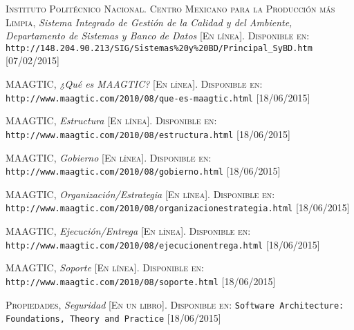 \begin{thebibliography}{X}
		\textsc{Instituto Politécnico Nacional. Centro Mexicano para la Producción más Limpia},
		\textit{Sistema Integrado de Gestión de la Calidad y del Ambiente, Departamento de Sistemas y Banco de Datos}
		\textsc{[En línea]. Disponible en:}
		\texttt{http://148.204.90.213/SIG/Sistemas\%20y\%20BD/Principal\_SyBD.htm}
		\textsc{[07/02/2015]}
		
		\textsc{MAAGTIC},
		\textit{¿Qué es MAAGTIC?}
		\textsc{[En línea]. Disponible en:}
		\texttt{http://www.maagtic.com/2010/08/que-es-maagtic.html}
		\textsc{[18/06/2015]}
		
		\textsc{MAAGTIC},
		\textit{Estructura}
		\textsc{[En línea]. Disponible en:}
		\texttt{http://www.maagtic.com/2010/08/estructura.html}
		\textsc{[18/06/2015]}
		
		\textsc{MAAGTIC},
		\textit{Gobierno}
		\textsc{[En línea]. Disponible en:}
		\texttt{http://www.maagtic.com/2010/08/gobierno.html}
		\textsc{[18/06/2015]}

		\textsc{MAAGTIC},
		\textit{Organización/Estrategia}
		\textsc{[En línea]. Disponible en:}
		\texttt{http://www.maagtic.com/2010/08/organizacionestrategia.html}
		\textsc{[18/06/2015]}

		\textsc{MAAGTIC},
		\textit{Ejecución/Entrega}
		\textsc{[En línea]. Disponible en:}
		\texttt{http://www.maagtic.com/2010/08/ejecucionentrega.html}
		\textsc{[18/06/2015]}
		
		\textsc{MAAGTIC},
		\textit{Soporte}
		\textsc{[En línea]. Disponible en:}
		\texttt{http://www.maagtic.com/2010/08/soporte.html}
		\textsc{[18/06/2015]}
		
		\textsc{Propiedades},
		\textit{Seguridad}
		\textsc{[En un libro]. Disponible en:}
		\texttt{Software Architecture: Foundations, Theory and Practice}
		\textsc{[18/06/2015]}
		
\end{thebibliography}
